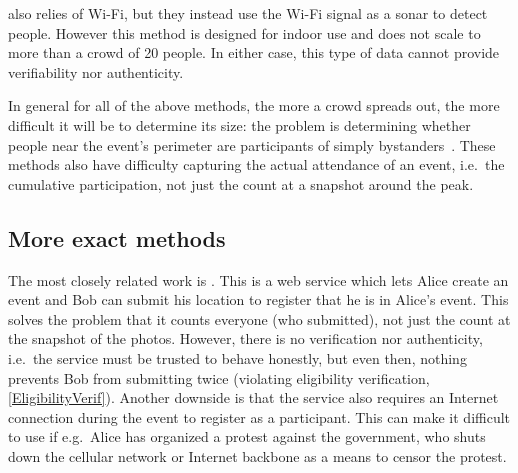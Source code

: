 \Textcite{WifiCrowdCounting} also relies of Wi-Fi, but they instead use the 
Wi-Fi signal as a sonar to detect people.
However this method is designed for indoor use and does not scale to more than 
a crowd of 20 people.
In either case, this type of data cannot provide verifiability nor 
authenticity.

In general for all of the above methods, the more a crowd spreads out, the more
difficult it will be to determine its size:
the problem is determining whether people near the event's perimeter are 
participants of simply bystanders~\cite{HowToEstimateCrowdSize}.
These methods also have difficulty capturing the actual attendance of an event,
i.e.\ the cumulative participation, not just the count at a snapshot around the 
peak.

%

\subsection<presentation>{More exact methods}

The most closely related work is \textcite{CrowdCount}.
This is a web service which lets Alice create an event and Bob can submit his 
location to register that he is in Alice's event.
This solves the problem that it counts everyone (who submitted), not just the 
count at the snapshot of the photos.
However, there is no verification nor authenticity, i.e.\ the service must be 
trusted to behave honestly, but even then, nothing prevents Bob from submitting 
twice (violating eligibility verification, \cref{EligibilityVerif}).
Another downside is that the service also requires an Internet connection 
during the event to register as a participant.
This can make it difficult to use if e.g.\ Alice has organized a protest 
against the government, who shuts down the cellular network or Internet 
backbone as a means to censor the protest.

